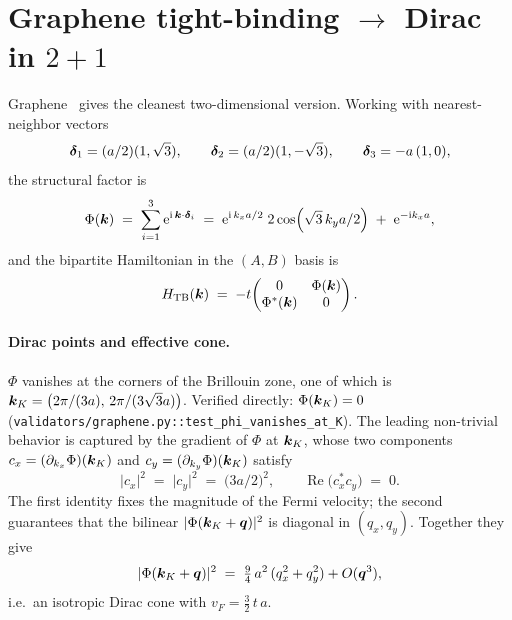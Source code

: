 \section{Graphene tight-binding \texorpdfstring{$\rightarrow$}{->} Dirac in \texorpdfstring{$2{+}1$}{(2+1)}}
\label{p:graphene}

Graphene~\cite{Semenoff1984,CastroNeto2009} gives the cleanest
two-dimensional version. Working with nearest-neighbor vectors
\[
\bm{\delta}_1 = (a/2)(1,\sqrt{3}),\qquad
\bm{\delta}_2 = (a/2)(1,-\sqrt{3}),\qquad
\bm{\delta}_3 = -a\,(1,0) ,
\]
the structural factor is
\begin{equation}
\Phi(\bm{k}) \;=\;
\sum_{i=1}^{3} \mathrm{e}^{\mathrm{i}\,\bm{k}\cdot\bm{\delta}_{i}}
\;=\; \mathrm{e}^{\mathrm{i}\,k_x a/2}\;2\cos(\sqrt{3}\,k_y a / 2)
  \;+\; \mathrm{e}^{-\mathrm{i} k_x a},
\label{p:eq:Phi}
\end{equation}
and the bipartite Hamiltonian in the $(A,B)$ basis is
\begin{equation}
H_{\mathrm{TB}}(\bm{k}) \;=\; -t\!\begin{pmatrix} 0 & \Phi(\bm{k}) \\ \Phi^{*}(\bm{k}) & 0 \end{pmatrix}.
\end{equation}

\paragraph{Dirac points and effective cone.}
$\Phi$ vanishes at the corners of the Brillouin zone, one of which is
$\bm{k}_{K}=\bigl(2\pi/(3a),\,2\pi/(3\sqrt{3}a)\bigr)$. Verified directly:
$\Phi(\bm{k}_{K})=0$
(\texttt{validators/graphene.py::test\_phi\_vanishes\_at\_K}).
The leading non-trivial behavior is captured by the gradient of $\Phi$ at
$\bm{k}_{K}$, whose two components $c_x = (\partial_{k_x}\Phi)(\bm{k}_{K})$ and
$c_y = (\partial_{k_y}\Phi)(\bm{k}_{K})$ satisfy
\begin{equation}
\lvert c_x\rvert^{2}\;=\;\lvert c_y\rvert^{2}\;=\;\bigl(3a/2\bigr)^{2},
\qquad
\operatorname{Re}\!\bigl(c_x^{*}c_y\bigr)\;=\;0 .
\label{p:eq:c-magnitudes}
\end{equation}
The first identity fixes the magnitude of the Fermi velocity; the second
guarantees that the bilinear $\lvert\Phi(\bm{k}_{K}+\bm{q})\rvert^{2}$ is
diagonal in $(q_x,q_y)$. Together they give
\begin{equation}
\lvert\Phi(\bm{k}_{K}+\bm{q})\rvert^{2}\;=\;\tfrac{9}{4}\,a^{2}\,(q_x^{2}+q_y^{2})
+ O(\bm{q}^{3}),
\end{equation}
i.e.\ an isotropic Dirac cone with $v_{F}=\tfrac{3}{2}\,t\,a$.

